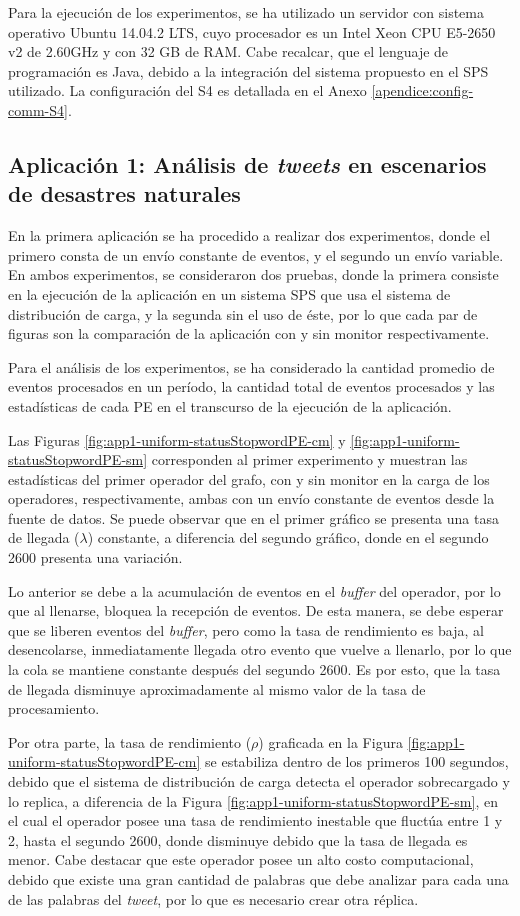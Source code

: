 Para la ejecución de los experimentos, se ha utilizado un servidor con sistema operativo Ubuntu 14.04.2 LTS, cuyo procesador es un Intel Xeon CPU E5-2650 v2 de 2.60GHz y con 32 GB de RAM. Cabe recalcar, que el lenguaje de programación es Java, debido a la integración del sistema propuesto en el SPS utilizado. La configuración del S4 es detallada en el Anexo \ref{apendice:config-comm-S4}.

\subsection{Aplicación 1: Análisis de \textit{tweets} en escenarios de desastres naturales}
En la primera aplicación se ha procedido a realizar dos experimentos, donde el primero consta de un envío constante de eventos, y el segundo un envío variable. En ambos experimentos, se consideraron dos pruebas, donde la primera consiste en la ejecución de la aplicación en un sistema SPS que usa el sistema de distribución de carga, y la segunda sin el uso de éste, por lo que cada par de figuras son la comparación de la aplicación con y sin monitor respectivamente.

Para el análisis de los experimentos, se ha considerado la cantidad promedio de eventos procesados en un período, la cantidad total de eventos procesados y las estadísticas de cada PE en el transcurso de la ejecución de la aplicación.

Las Figuras \ref{fig:app1-uniform-statusStopwordPE-cm} y \ref{fig:app1-uniform-statusStopwordPE-sm} corresponden al primer experimento y muestran las estadísticas del primer operador del grafo, con y sin monitor en la carga de los operadores, respectivamente, ambas con un envío constante de eventos desde la fuente de datos. Se puede observar que en el primer gráfico se presenta una tasa de llegada ($\lambda$) constante, a diferencia del segundo gráfico, donde en el segundo 2600 presenta una variación.

Lo anterior se debe a la acumulación de eventos en el \textit{buffer} del operador, por lo que al llenarse, bloquea la recepción de eventos. De esta manera, se debe esperar que se liberen eventos del \textit{buffer}, pero como la tasa de rendimiento es baja, al desencolarse, inmediatamente llegada otro evento que vuelve a llenarlo, por lo que la cola se mantiene constante después del segundo 2600. Es por esto, que la tasa de llegada disminuye aproximadamente al mismo valor de la tasa de procesamiento.

Por otra parte, la tasa de rendimiento ($\rho$) graficada en la Figura \ref{fig:app1-uniform-statusStopwordPE-cm} se estabiliza dentro de los primeros 100 segundos, debido que el sistema de distribución de carga detecta el operador sobrecargado y lo replica, a diferencia de la Figura \ref{fig:app1-uniform-statusStopwordPE-sm}, en el cual el operador posee una tasa de rendimiento inestable que fluctúa entre 1 y 2, hasta el segundo 2600, donde disminuye debido que la tasa de llegada es menor. Cabe destacar que este operador posee un alto costo computacional, debido que existe una gran cantidad de palabras que debe analizar para cada una de las palabras del \textit{tweet}, por lo que es necesario crear otra réplica.

